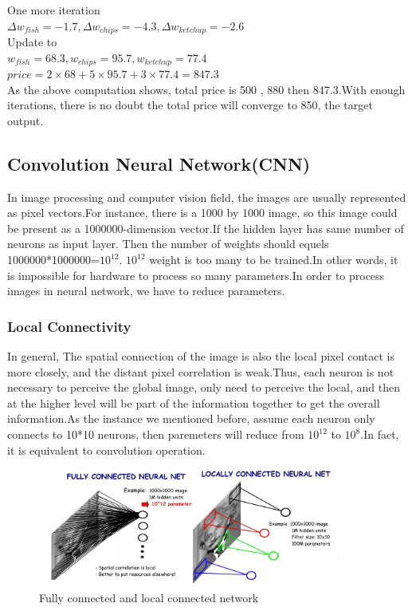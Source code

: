 \documentclass[12pt,a4paper]{report}
\begin{document}
One more iteration\\

$\Delta w_{fish}=-1.7,\Delta w_{chips}=-4.3,\Delta w_{ketchup}=-2.6$   \\

Update to\\

$w_{fish}=68.3,w_{chips}=95.7,w_{ketchup}=77.4$  \\

$price=2\times 68+5\times 95.7+3\times 77.4=847.3$\\
As the above computation  shows, total price is 500 , 880 then 847.3.With enough iterations, there is no doubt the total price will converge to 850, the target output.
\subsection{Convolution Neural Network(CNN)}
In image processing and computer vision field, the images are usually  represented as pixel vectors.For instance, there is a 1000 by 1000 image, so this image could be present as a 1000000-dimension vector.If the hidden layer has same number of neurons as input layer. Then the number of weights should equels 1000000*1000000=$10^{12}$. $10^{12}$ weight is too many to be trained.In other words, it is  impossible for hardware to process so many parameters.In order to process images in neural network, we have to reduce parameters.
\subsubsection{Local Connectivity}
In general, The spatial connection of the image is also the local pixel contact is more closely, and the distant pixel correlation is weak.Thus, each neuron is not necessary to perceive the global image, only need to perceive the local, and then at the higher level will be part of the information together to get the overall information.As the instance we mentioned before, assume each neuron only connects to 10*10 neurons, then paremeters will reduce from $10^{12}$ to $10^8$.In fact, it is equivalent to convolution operation.
\begin{figure}[h]
\centering
\includegraphics[width=0.9\textwidth]{localconnect.png}
\caption{Fully connected and local connected network}
\end{figure}
\end{document}
